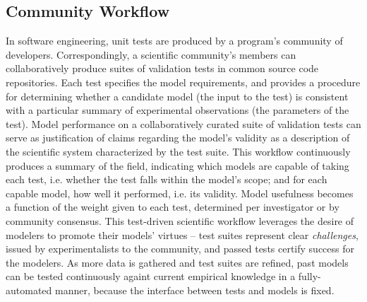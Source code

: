 \documentclass[11pt,letterpaper]{article}
\begin{document}
\subsection{Community Workflow}
In software engineering, unit tests are produced by a program's community of developers. Correspondingly, a scientific community's members can collaboratively produce suites of validation tests in common source code repositories. Each test specifies the model requirements, and provides a procedure for determining whether a candidate model (the input to the test) is consistent with a particular summary of experimental observations (the parameters of the test). Model performance on a collaboratively curated suite of validation tests can serve as justification of claims regarding the model's validity as a description of the scientific system characterized by the test suite.
This workflow continuously produces a summary of the field, indicating which models are capable of taking each test, i.e. whether the test falls within the model's scope; and for each capable model, how well it performed, i.e. its validity.  Model usefulness becomes a function of the weight given to each test, determined per investigator or by community consensus. This test-driven scientific workflow leverages the desire of modelers to promote their models' virtues -- test suites represent clear \emph{challenges}, issued by experimentalists to the community, and passed tests certify success for the modelers. As more data is gathered and test suites are refined, past models can be tested continuously againt current empirical knowledge in a fully-automated manner, because the interface between tests and models is fixed.  
\end{document}
